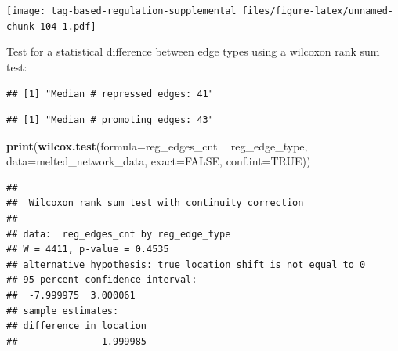 \documentclass[]{book}
\newenvironment{Shaded}{\begin{snugshade}}{\end{snugshade}}
\newcommand{\DataTypeTok}[1]{\textcolor[rgb]{0.13,0.29,0.53}{#1}}
\newcommand{\KeywordTok}[1]{\textcolor[rgb]{0.13,0.29,0.53}{\textbf{#1}}}
\newcommand{\NormalTok}[1]{#1}
\newcommand{\OperatorTok}[1]{\textcolor[rgb]{0.81,0.36,0.00}{\textbf{#1}}}
\newcommand{\OtherTok}[1]{\textcolor[rgb]{0.56,0.35,0.01}{#1}}
\newcommand{\StringTok}[1]{\textcolor[rgb]{0.31,0.60,0.02}{#1}}
\begin{document}
\texttt{[image: tag-based-regulation-supplemental\_files/figure-latex/unnamed-chunk-104-1.pdf]}

Test for a statistical difference between edge types using a wilcoxon rank sum test:

\begin{Shaded}
\end{Shaded}

\begin{verbatim}
## [1] "Median # repressed edges: 41"
\end{verbatim}

\begin{Shaded}
\end{Shaded}

\begin{verbatim}
## [1] "Median # promoting edges: 43"
\end{verbatim}

\begin{Shaded}
\begin{Highlighting}[]
\KeywordTok{print}\NormalTok{(}\KeywordTok{wilcox.test}\NormalTok{(}\DataTypeTok{formula=}\NormalTok{reg_edges_cnt }\OperatorTok{~}\StringTok{ }\NormalTok{reg_edge_type, }\DataTypeTok{data=}\NormalTok{melted_network_data, }\DataTypeTok{exact=}\OtherTok{FALSE}\NormalTok{, }\DataTypeTok{conf.int=}\OtherTok{TRUE}\NormalTok{))}
\end{Highlighting}
\end{Shaded}

\begin{verbatim}
## 
##  Wilcoxon rank sum test with continuity correction
## 
## data:  reg_edges_cnt by reg_edge_type
## W = 4411, p-value = 0.4535
## alternative hypothesis: true location shift is not equal to 0
## 95 percent confidence interval:
##  -7.999975  3.000061
## sample estimates:
## difference in location 
##              -1.999985
\end{verbatim}
\end{document}
